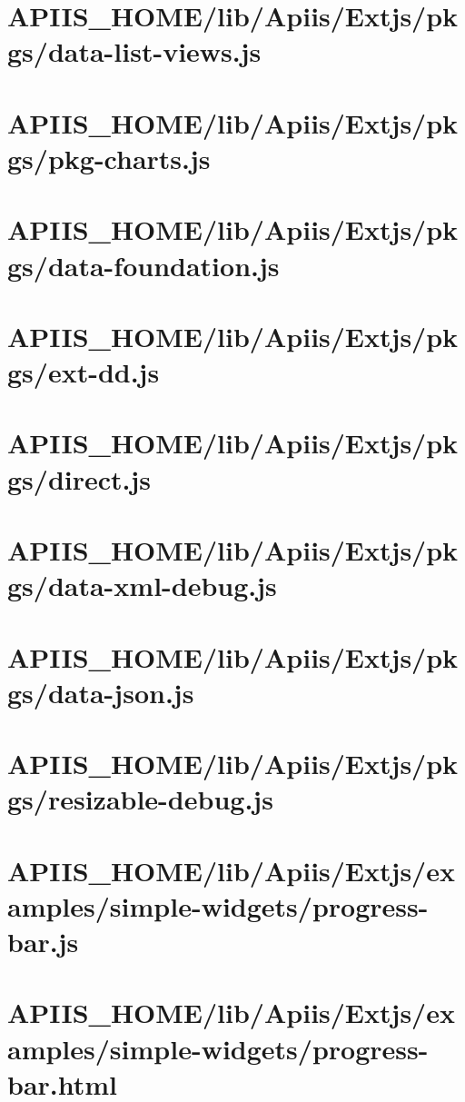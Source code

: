 \section{APIIS\_HOME/lib/Apiis/Extjs/pkgs/data-list-views.js} 
\section{APIIS\_HOME/lib/Apiis/Extjs/pkgs/pkg-charts.js} 
\section{APIIS\_HOME/lib/Apiis/Extjs/pkgs/data-foundation.js} 
\section{APIIS\_HOME/lib/Apiis/Extjs/pkgs/ext-dd.js} 
\section{APIIS\_HOME/lib/Apiis/Extjs/pkgs/direct.js} 
\section{APIIS\_HOME/lib/Apiis/Extjs/pkgs/data-xml-debug.js} 
\section{APIIS\_HOME/lib/Apiis/Extjs/pkgs/data-json.js} 
\section{APIIS\_HOME/lib/Apiis/Extjs/pkgs/resizable-debug.js} 
\section{APIIS\_HOME/lib/Apiis/Extjs/examples/simple-widgets/progress-bar.js} 
\section{APIIS\_HOME/lib/Apiis/Extjs/examples/simple-widgets/progress-bar.html} 
